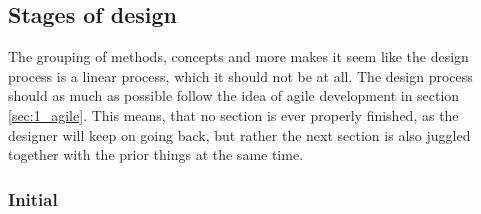 \subsection{Stages of design}
The grouping of methods, concepts and more makes it seem like the design process is a linear process, which it should not be at all. The design process should as much as possible follow the idea of agile development in section \ref{sec:1_agile}. This means, that no section is ever properly finished, as the designer will keep on going back, but rather the next section is also juggled together with the prior things at the same time.

\subsubsection{Initial}
\label{sec:1_initial}

\begin{framework}[PACT] \label{fw:pact} 
  
\end{framework}